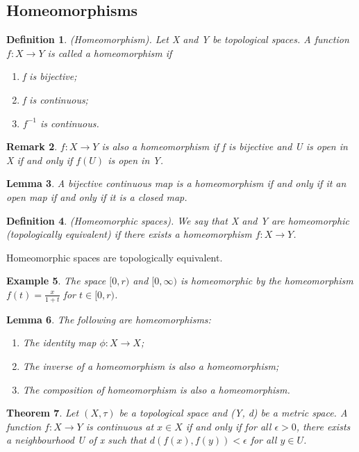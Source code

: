 \documentclass[twoside]{article}
\newcounter{lecnum}
\newtheorem{theorem}{Theorem}[lecnum]
\newtheorem{lemma}[theorem]{Lemma}
\newtheorem{definition}[theorem]{Definition}
\newtheorem{remark}[theorem]{Remark}
\newtheorem{example}[theorem]{Example}
\begin{document}
\subsection{Homeomorphisms}
\begin{definition}(Homeomorphism). Let X and Y be topological spaces. A function $f: X \rightarrow Y$ is called a homeomorphism if
\begin{enumerate}
\item f is bijective;
\item f is continuous;
\item $f^{-1}$ is continuous.
\end{enumerate}
\end{definition}

\begin{remark}$f: X \rightarrow Y$ is also a homeomorphism if f is bijective and U is open in X if and only if $f(U)$ is open in Y.
\end{remark}

\begin{lemma}A bijective continuous map is a homeomorphism if and only if it an open map if and only if it is a closed map.
\end{lemma}

\begin{definition}(Homeomorphic spaces). We say that X and Y are homeomorphic (topologically equivalent) if there exists a homeomorphism $f: X \rightarrow Y$.
\end{definition}

Homeomorphic spaces are topologically equivalent.

\begin{example}The space $[0,r)$ and $[0,\infty)$ is homeomorphic by the homeomorphism $f(t) = \frac{x}{1+t}$ for $t \in [0,r)$.
\end{example}

\begin{lemma}The following are homeomorphisms:
\begin{enumerate}
\item The identity map $\phi: X \rightarrow X$;
\item The inverse of a homeomorphism is also a homeomorphism;
\item The composition of homeomorphism is also a homeomorphism.
\end{enumerate}
\end{lemma}

\begin{theorem}Let $(X, \tau)$ be a topological space and (Y, d) be a metric space. A function $f: X \rightarrow Y$ is continuous at $x \in X$ if and only if for all $\epsilon > 0$, there exists a neighbourhood U of x such that $d(f(x), f(y)) < \epsilon$ for all $y \in U$.
\end{theorem}
\end{document}
